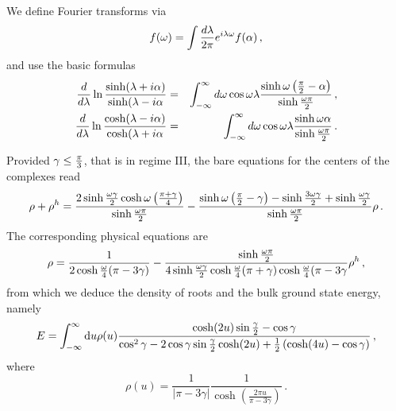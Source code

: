 \documentclass[11pt]{article}
\begin{document}
We define  Fourier transforms  via
%
\begin{equation}
f(\omega)=\int {d\lambda\over 2\pi} e^{i \lambda \omega} f(\alpha) \,,
\end{equation}
%
and use the basic formulas
%
\begin{eqnarray}
{d\over d\lambda}\ln {\sinh(\lambda+i\alpha)\over \sinh(\lambda-i\alpha}&=&\int_{-\infty}^\infty d\omega\cos\omega\lambda
{\sinh \omega \left({\pi\over 2}-\alpha\right)\over \sinh{\omega\pi\over 2}} \,, \nonumber\\
{d\over d\lambda}\ln {\cosh(\lambda-i\alpha)\over \cosh(\lambda+i\alpha}&=&\int_{-\infty}^\infty d\omega\cos\omega\lambda
{\sinh \omega \alpha\over \sinh{\omega\pi\over 2}} \,.
\end{eqnarray}
%

Provided $\gamma\leq {\pi\over 3}$, that is in regime III, the bare equations for the centers of the complexes read 
%
\begin{equation}
\rho+\rho^h={2\sinh {\omega\gamma\over 2}\cosh \omega\left({\pi+\gamma\over 4}\right)\over \sinh {\omega\pi\over 2}}-{\sinh \omega\left({\pi\over 2}-\gamma\right)-\sinh {3\omega\gamma\over 2}+\sinh {\omega\gamma\over 2}\over \sinh {\omega\pi\over 2}}\rho \,.
\end{equation}
%
The corresponding physical equations are
%
\begin{equation}
\rho={1\over 2\cosh {\omega\over 4}(\pi-3\gamma)}-{\sinh {\omega\pi\over 2}\over 
4\sinh {\omega\gamma\over 2}\cosh {\omega\over 4}(\pi+\gamma)\cosh {\omega\over 4}(\pi-3\gamma}\rho^h \,,
\end{equation}
%
from which we deduce the density of roots and the bulk ground state energy, namely
%
\begin{equation}
E = \int_{-\infty}^{\infty}\mathrm{d}u \rho(u)
\frac{\cosh(2u)\sin{\gamma\over 2} - \cos\gamma}
{\cos^2 \gamma - 2 \cos\gamma \sin{\gamma\over 2}\cosh(2u) + \frac{1}{2}\left(\cosh(4u) - \cos\gamma \right) } \,,
\label{eq:ethermo}
\end{equation}
%
where
%
\begin{equation}
 \rho(u) = \frac{1}{\left|\pi - 3 \gamma\right|} \frac{1}{\cosh\left( \frac{2\pi u}{\pi - 3 \gamma} \right)} \,.
\end{equation}
\end{document}
